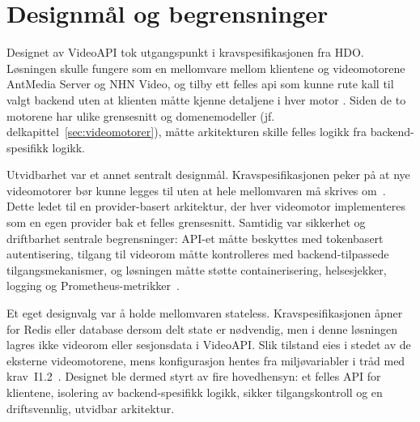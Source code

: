 \section{Designmål og begrensninger}
\label{sec:designmal}


Designet av VideoAPI tok utgangspunkt i kravspesifikasjonen fra HDO. Løsningen skulle fungere som en mellomvare mellom klientene og videomotorene AntMedia Server og NHN Video, og tilby ett felles \gls{api} som kunne rute kall til valgt backend uten at klienten måtte kjenne detaljene i hver motor \cite{hdo_kravspec}. Siden de to motorene har ulike grensesnitt og domenemodeller (jf. delkapittel~\ref{sec:videomotorer}), måtte arkitekturen skille felles logikk fra backend-spesifikk logikk.

Utvidbarhet var et annet sentralt designmål. Kravspesifikasjonen peker på at nye
videomotorer bør kunne legges til uten at hele mellomvaren må skrives
om~\cite{hdo_kravspec}. Dette ledet til en provider-basert arkitektur, der hver
videomotor implementeres som en egen provider bak et felles grensesnitt. Samtidig
var sikkerhet og driftbarhet sentrale begrensninger: API-et måtte beskyttes med
tokenbasert autentisering, tilgang til videorom måtte kontrolleres med
backend-tilpassede tilgangsmekanismer, og løsningen måtte støtte
containerisering, helsesjekker, logging og Prometheus-metrikker~\cite{hdo_kravspec}.

Et eget designvalg var å holde mellomvaren stateless. Kravspesifikasjonen åpner
for Redis eller database dersom delt state er nødvendig, men i denne løsningen
lagres ikke videorom eller sesjonsdata i VideoAPI. Slik tilstand eies i stedet
av de eksterne videomotorene, mens konfigurasjon hentes fra miljøvariabler i
tråd med krav~I1.2~\cite{hdo_kravspec}. Designet ble dermed styrt av fire
hovedhensyn: et felles API for klientene, isolering av backend-spesifikk logikk,
sikker tilgangskontroll og en driftsvennlig, utvidbar arkitektur.